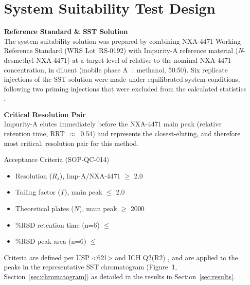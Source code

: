 \section{System Suitability Test Design}
\label{sec:sst_design}

\begin{minipage}[t]{0.55\textwidth}
\vspace{0pt}
\textbf{Reference Standard \& SST Solution}\\
The system suitability solution was prepared by combining NXA-4471 Working Reference Standard (WRS Lot~RS-0192) with Impurity-A reference material (\textit{N}-desmethyl-NXA-4471) at a target level of  relative to the nominal NXA-4471 concentration, in diluent (mobile phase A~:~methanol, 50:50). Six replicate  injections of the SST solution were made under equilibrated system conditions, following two priming injections that were excluded from the calculated statistics \cite{Snyder2010}.

\vspace{6pt}
\textbf{Critical Resolution Pair}\\
Impurity-A elutes immediately before the NXA-4471 main peak (relative retention time, RRT~$\approx$~0.54) and represents the closest-eluting, and therefore most critical, resolution pair for this method.
\end{minipage}%
\hfill%
\begin{minipage}[t]{0.42\textwidth}
\vspace{0pt}
\begin{infobox}{Acceptance Criteria (SOP-QC-014)}
\small
\begin{itemize}[leftmargin=1.0em,itemsep=2pt]
  \item Resolution ($R_s$), Imp-A/NXA-4471 $\geq$ 2.0
  \item Tailing factor ($T$), main peak $\leq$ 2.0
  \item Theoretical plates ($N$), main peak $\geq$ 2000
  \item \%RSD retention time (n=6) $\leq$ 
  \item \%RSD peak area (n=6) $\leq$ 
\end{itemize}
\end{infobox}
\end{minipage}

\par\vspace{4pt}
Criteria are defined per USP <621> \cite{USP621} and ICH Q2(R2) \cite{ICHQ2R2}, and are applied to the peaks in the representative SST chromatogram (Figure~1, Section~\ref{sec:chromatogram}) as detailed in the results in Section~\ref{sec:results}.
